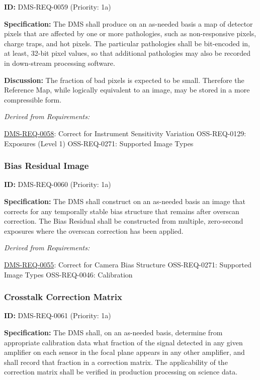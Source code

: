 \documentclass[SE,toc,lsstdraft]{lsstdoc}
\begin{document}
\label{DMS-REQ-0059}
\textbf{ID:} DMS-REQ-0059 (Priority: 1a)

\textbf{Specification: }The DMS shall produce on an as-needed basis a map of detector pixels that are affected by one or more pathologies, such as non-responsive pixels, charge traps, and hot pixels. The particular pathologies shall be bit-encoded in, at least, 32-bit pixel values, so that additional pathologies may also be recorded in down-stream processing software.

\textbf{Discussion:} The fraction of bad pixels is expected to be small. Therefore the Reference Map, while logically equivalent to an image, may be stored in a more compressible form.

\emph{Derived from Requirements:}

\hyperref[DMS-REQ-0058]{DMS-REQ-0058}:
Correct for Instrument Sensitivity Variation \newline
OSS-REQ-0129:
Exposures (Level 1) \newline
OSS-REQ-0271:
Supported Image Types \newline

\subsubsection{Bias Residual Image}

\label{DMS-REQ-0060}
\textbf{ID:} DMS-REQ-0060 (Priority: 1a)

\textbf{Specification:} The DMS shall construct on an as-needed basis an image that corrects for any temporally stable bias structure that remains after overscan correction. The Bias Residual shall be constructed from multiple, zero-second exposures where the overscan correction has been applied.

\emph{Derived from Requirements:}

\hyperref[DMS-REQ-0055]{DMS-REQ-0055}:
Correct for Camera Bias Structure \newline
OSS-REQ-0271:
Supported Image Types \newline
OSS-REQ-0046:
Calibration \newline

\subsubsection{Crosstalk Correction Matrix}

\label{DMS-REQ-0061}
\textbf{ID:} DMS-REQ-0061 (Priority: 1a)

\textbf{Specification:} The DMS shall, on an as-needed basis, determine from appropriate calibration data what fraction of the signal detected in any given amplifier on each sensor in the focal plane appears in any other amplifier, and shall record that fraction in a correction matrix. The applicability of the correction matrix shall be verified in production processing on science data.
\end{document}
